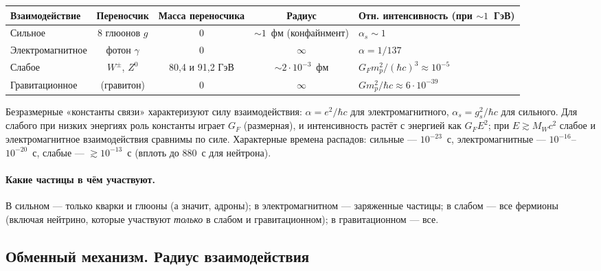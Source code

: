 \begin{center}
\small
\begin{tabularx}{\linewidth}{@{}lccc>{\raggedright\arraybackslash}X@{}}
\toprule
Взаимодействие & Переносчик & Масса переносчика & Радиус & Отн. интенсивность (при $\sim1$~ГэВ) \\
\midrule
Сильное & 8 глюонов $g$ & 0 & $\sim1$~фм (конфайнмент) & $\alpha_s\sim1$ \\
Электромагнитное & фотон $\gamma$ & 0 & $\infty$ & $\alpha=1/137$ \\
Слабое & $W^\pm$, $Z^0$ & 80,4 и 91,2 ГэВ & $\sim2\cdot10^{-3}$~фм & $G_Fm_p^2/(\hbar c)^3\approx10^{-5}$ \\
Гравитационное & (гравитон) & 0 & $\infty$ & $Gm_p^2/\hbar c\approx6\cdot10^{-39}$ \\
\bottomrule
\end{tabularx}
\end{center}

\noindent Безразмерные «константы связи» характеризуют силу взаимодействия: $\alpha=e^2/\hbar c$ для
электромагнитного, $\alpha_s=g_s^2/\hbar c$ для сильного. Для слабого при низких энергиях роль константы
играет $G_F$ (размерная), и интенсивность растёт с энергией как $G_FE^2$; при $E\gtrsim M_Wc^2$ слабое и
электромагнитное взаимодействия сравнимы по силе. Характерные времена распадов: сильные — $10^{-23}$~с,
электромагнитные — $10^{-16}$--$10^{-20}$~с, слабые — $\gtrsim10^{-13}$~с (вплоть до 880~с для нейтрона).

\paragraph{Какие частицы в чём участвуют.} В сильном — только кварки и глюоны (а значит, адроны);
в электромагнитном — заряженные частицы; в слабом — все фермионы (включая нейтрино, которые участвуют
\emph{только} в слабом и гравитационном); в гравитационном — все.

\subsection{Обменный механизм. Радиус взаимодействия}


